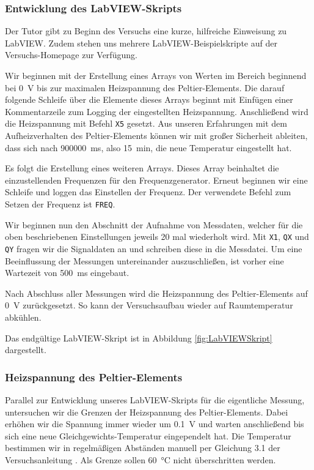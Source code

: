 \endminipage

\subsubsection*{Entwicklung des LabVIEW-Skripts}

Der Tutor gibt zu Beginn des Versuchs eine kurze, hilfreiche Einweisung zu LabVIEW.
Zudem stehen uns mehrere LabVIEW-Beispielskripte auf der Versuchs-Homepage zur Verfügung.

Wir beginnen mit der Erstellung eines Arrays von Werten im Bereich beginnend bei \SI{0}{\volt} bis zur maximalen Heizspannung des Peltier-Elements.
Die darauf folgende Schleife über die Elemente dieses Arrays beginnt mit Einfügen einer Kommentarzeile zum Logging der eingestellten Heizspannung.
Anschließend wird die Heizspannung mit Befehl \texttt{X5} gesetzt.
Aus unseren Erfahrungen mit dem Aufheizverhalten des Peltier-Elements können wir mit großer Sicherheit ableiten, dass sich nach \SI{900000}{\milli\second}, also \SI{15}{\minute}, die neue Temperatur eingestellt hat.

Es folgt die Erstellung eines weiteren Arrays.
Dieses Array beinhaltet die einzustellenden Frequenzen für den Frequenzgenerator.
Erneut beginnen wir eine Schleife und loggen das Einstellen der Frequenz.
Der verwendete Befehl zum Setzen der Frequenz ist \texttt{FREQ}.

Wir beginnen nun den Abschnitt der Aufnahme von Messdaten, welcher für die oben beschriebenen Einstellungen jeweils 20 mal wiederholt wird.
Mit \texttt{X1}, \texttt{QX} und \texttt{QY} fragen wir die Signaldaten an und schreiben diese in die Messdatei.
Um eine Beeinflussung der Messungen untereinander auszuschließen, ist vorher eine Wartezeit von \SI{500}{\milli\second} eingebaut.

Nach Abschluss aller Messungen wird die Heizspannung des Peltier-Elements auf \SI{0}{\volt} zurückgesetzt.
So kann der Versuchsaufbau wieder auf Raumtemperatur abkühlen.

Das endgültige LabVIEW-Skript ist in Abbildung \ref{fig:LabVIEWSkript} dargestellt.

\subsubsection*{Heizspannung des Peltier-Elements}

Parallel zur Entwicklung unseres LabVIEW-Skripts für die eigentliche Messung, untersuchen wir die Grenzen der Heizspannung des Peltier-Elements.
Dabei erhöhen wir die Spannung immer wieder um \SI{0.1}{\volt} und warten anschließend bis sich eine neue Gleichgewichts-Temperatur eingependelt hat.
Die Temperatur bestimmen wir in regelmäßigen Abständen manuell per Gleichung 3.1 der Versuchsanleitung \cite{Anleitung}.
Als Grenze sollen \SI{60}{\celsius} nicht überschritten werden.

